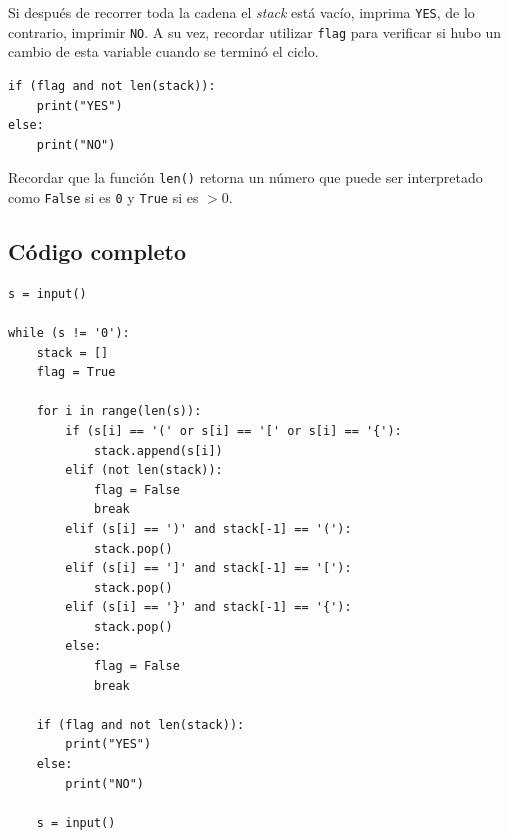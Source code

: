 \documentclass{article}
\begin{document}
Si después de recorrer toda la cadena el \textit{stack} está vacío, imprima \texttt{YES}, de lo contrario, imprimir \texttt{NO}. A su vez, recordar utilizar \texttt{flag} para verificar si hubo un cambio de esta variable cuando se terminó el ciclo.

\begin{lstlisting}[style=pythonstyle]
if (flag and not len(stack)):
    print("YES")
else:
    print("NO")
\end{lstlisting}

Recordar que la función \lstinline[style=pythonstyle]{len()} retorna un número que puede ser interpretado como \lstinline[style=pythonstyle]{False} si es \texttt{0} y \lstinline[style=pythonstyle]{True} si es \(> 0\).

\subsection{Código completo}

\begin{lstlisting}[style=pythonstyle]
s = input()

while (s != '0'):
    stack = []
    flag = True

    for i in range(len(s)):
        if (s[i] == '(' or s[i] == '[' or s[i] == '{'):
            stack.append(s[i])
        elif (not len(stack)):
            flag = False
            break
        elif (s[i] == ')' and stack[-1] == '('):
            stack.pop()
        elif (s[i] == ']' and stack[-1] == '['):
            stack.pop()
        elif (s[i] == '}' and stack[-1] == '{'):
            stack.pop()
        else:
            flag = False
            break

    if (flag and not len(stack)):
        print("YES")
    else:
        print("NO")

    s = input()
\end{lstlisting}


\newpage

\thispagestyle{empty}

\vspace*{0.3\textwidth}

\begin{figure}[H]
  \centering
  
\end{figure}
\end{document}
